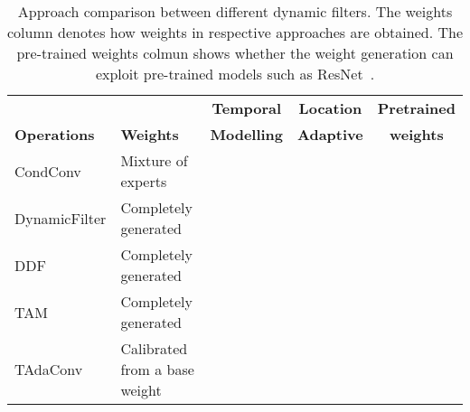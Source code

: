\documentclass[10pt,journal,compsoc]{IEEEtran}
\newcommand{\cmark}{\color{good}\ding{51}}\newcommand{\xmark}{\color{bad}\ding{55}}
\newcommand{\tablestyle}[2]{\setlength{\tabcolsep}{#1}\renewcommand{\arraystretch}{#2}\centering\small}
\begin{document}
\begin{table*}[t]
    \tablestyle{3pt}{1.0}
\caption{Approach comparison between different dynamic filters. The weights column denotes how weights in respective approaches are obtained. The pre-trained weights colmun shows whether the weight generation can exploit pre-trained models such as ResNet~\cite{resnet}. 
}
\centering
\begin{tabular}{llccc}
\toprule
 ~ & ~ & \textbf{Temporal} &  \textbf{Location} & \textbf{Pretrained}\\
\textbf{Operations} & \textbf{Weights} & \textbf{Modelling} & \textbf{Adaptive} & \textbf{weights}\\
\midrule
 CondConv & Mixture of experts  &\xmark & \xmark & \xmark \\
 DynamicFilter & Completely generated  &\xmark & \xmark & \xmark \\
 DDF & Completely generated  & \xmark & \cmark & \xmark \\
 TAM & Completely generated  & \cmark & \xmark & \xmark \\
 TAdaConv & Calibrated from a base weight & \cmark & \cmark & \cmark \\
\bottomrule
\end{tabular}
\label{tab:compdyconvfull}
\end{table*}
\end{document}
